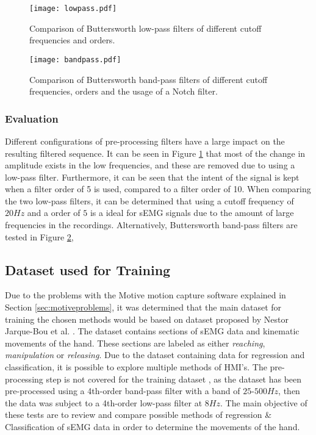 \documentclass[../main.tex]{subfiles}
\begin{document}
\begin{figure}[H]
\begin{center}
\texttt{[image: lowpass.pdf]}
\caption{Comparison of Buttersworth low-pass filters of different cutoff frequencies and orders.}
\label{fig:lowpass}
\end{center}
\end{figure}
\begin{figure}[H]
\begin{center}
\texttt{[image: bandpass.pdf]}
\caption{Comparison of Buttersworth band-pass filters of different cutoff frequencies, orders and the usage of a Notch filter.}
\label{fig:bandpass}
\end{center}
\end{figure}

\subsubsection{Evaluation}

Different configurations of pre-processing filters have a large impact on the resulting filtered sequence. 
It can be seen in Figure \ref{fig:lowpass} that most of the change in amplitude exists in the low frequencies, and these are removed due to using a low-pass filter.
Furthermore, it can be seen that the intent of the signal is kept when a filter order of 5 is used, compared to a filter order of 10.
When comparing the two low-pass filters, it can be determined that using a cutoff frequency of $20Hz$ and a order of $5$ is a ideal for sEMG signals due to the amount of large frequencies in the recordings.
Alternatively, Buttersworth band-pass filters are tested in Figure \ref{fig:bandpass},

\subsection{Dataset used for Training}

Due to the problems with the Motive motion capture software explained in Section \ref{sec:motiveproblems}, it was determined that the main dataset for training the chosen methods would be based on dataset \cite{kinmusdataset} proposed by Nestor Jarque-Bou et al. \cite{jarque2019}.
The dataset contains sections of sEMG data and kinematic movements of the hand.
These sections are labeled as either \textit{reaching}, \textit{manipulation} or \textit{releasing}.  
Due to the dataset containing data for regression and classification, it is possible to explore multiple methods of HMI's. 
The pre-processing step is not covered for the training dataset \cite{kinmusdataset}, as the dataset has been pre-processed using a 4th-order band-pass filter with a band of  $25$-$500Hz$, then the data was subject to a 4th-order low-pass filter at $8 Hz$.
The main objective of these tests are to review and compare possible methods of regression \& Classification of sEMG data in order to determine the movements of the hand.
\end{document}

